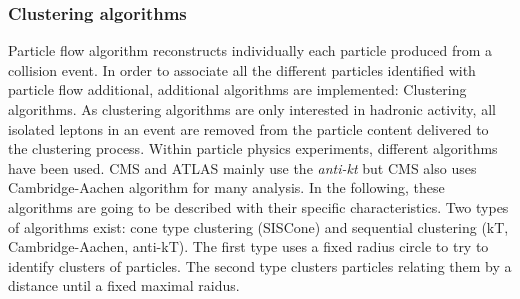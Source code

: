 \subsubsection{Clustering algorithms}

Particle flow algorithm reconstructs individually each particle produced from a collision event. In order to associate all the different particles identified with particle flow additional, additional algorithms are implemented: Clustering algorithms. As clustering algorithms are only interested in hadronic activity, all isolated leptons in an event are removed from the particle content delivered to the clustering process. Within particle physics experiments, different algorithms have been used. CMS and ATLAS mainly use the \textit{anti-kt} but CMS also uses Cambridge-Aachen algorithm for many analysis. In the following, these algorithms are going to be described with their specific characteristics. Two types of algorithms exist: cone type clustering (SISCone) and sequential clustering (kT, Cambridge-Aachen, anti-kT). The first type uses a fixed radius circle to try to identify clusters of particles. The second type clusters particles relating them by a distance until a fixed maximal raidus. 

